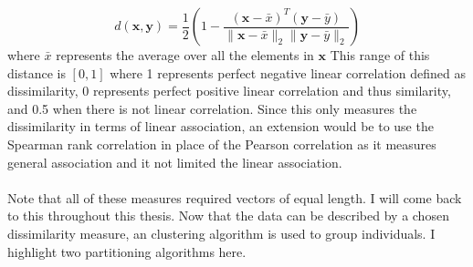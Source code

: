 \documentclass[12pt]{article}
\newcommand{\B}[0]{\mathbf}
\begin{document}
$$d(\B x,\B y) = \frac{1}{2}\left(1 - \frac{(\B x - \bar{x})^{T}(\B y - \bar{y})}{\|\B x - \bar{x}\|_{2}\|\B y - \bar{y}\|_{2}}\right)$$
where $\bar{x}$ represents the average over all the elements in $\B x$ This range of this distance is $[0,1]$ where 1 represents perfect negative linear correlation defined as dissimilarity, 0 represents perfect positive linear correlation and thus similarity, and 0.5 when there is not linear correlation. Since this only measures the dissimilarity in terms of linear association, an extension would be to use the Spearman rank correlation in place of the Pearson correlation as it measures general association and it not limited the linear association.\\\\
Note that all of these measures required vectors of equal length. I will come back to this throughout this thesis. Now that the data can be described by a chosen dissimilarity measure, an clustering algorithm is used to group individuals. I highlight two partitioning algorithms here.
\end{document}
